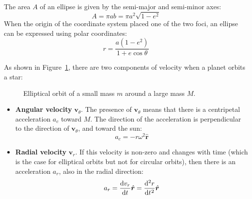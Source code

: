 The area $A$ of an ellipse is given by the semi-major and semi-minor axes:
\begin{equation}
  A=\pi ab=\pi a^2\sqrt{1-e^2}
  \label{A2}
\end{equation}
When the origin of the coordinate system placed one of the two foci, an ellipse
can be expressed using polar coordinates:
\begin{equation}
  r=\frac{a(1-e^2)}{1+e\cos\theta}
  \label{ellipse-eq}
\end{equation}

As shown in Figure~\ref{eorbit}, there are two components of velocity when a
planet orbits a star:
\begin{figure}[!ht]
  \centering
  \caption{Elliptical orbit of a small mass $m$ around a large mass $M$.}
  \label{eorbit}
\end{figure}
\begin{itemize}[itemsep=6pt]
\item\textbf{Angular velocity} $\bm v_\theta$. The presence of
  $\bm v_\theta$ means that there is a centripetal acceleration $a_c$ toward
  $M$. The direction of the acceleration is perpendicular to the direction of
  $\bm v_\theta$, and toward the sun:
  \begin{equation}
    a_c=-r\omega^2\hat{\bm r}
  \end{equation}
\item\textbf{Radial velocity} $\bm v_r$. If this velocity is non-zero and
  changes with time (which is the case for elliptical orbits but not for
  circular orbits), then there is an acceleration $a_r$, also in the radial
  direction:
  \begin{equation}
    a_r=\diff{v_r}t\hat{\bm r}=\diff[2]rt\hat{\bm r}
  \end{equation}
\end{itemize}
